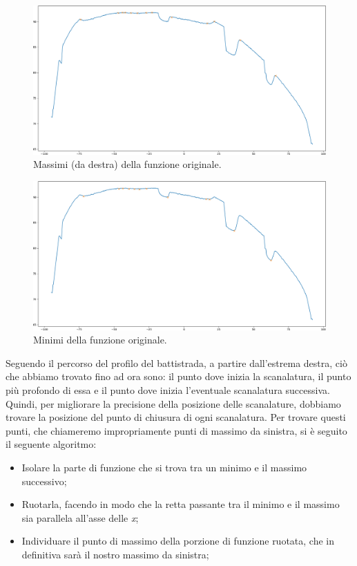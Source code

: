 \begin{figure}[H]
	\centering
	\includegraphics[width=0.9\columnwidth]{./pictures/batt_2_analisi_6.png}
	\caption{Massimi (da destra) della funzione originale.}\label{fig:batt_2_analisi_6}
\end{figure}

\begin{figure}[H]
	\centering
	\includegraphics[width=0.9\columnwidth]{./pictures/batt_2_analisi_7.png}
	\caption{Minimi della funzione originale.}\label{fig:batt_2_analisi_7}
\end{figure}

\noindent Seguendo il percorso del profilo del battistrada, a partire dall'estrema destra, ciò che abbiamo trovato fino ad ora sono: il punto dove inizia la scanalatura, il punto più profondo di essa e il punto dove inizia l'eventuale scanalatura successiva.\\
\newline
Quindi, per migliorare la precisione della posizione delle scanalature, dobbiamo trovare la posizione del punto di chiusura di ogni scanalatura.
\newpage
\noindent Per trovare questi punti, che chiameremo impropriamente punti di massimo da sinistra, si è seguito il seguente algoritmo:

\begin{itemize}
	\item Isolare la parte di funzione che si trova tra un minimo e il massimo successivo;
	\item Ruotarla, facendo in modo che la retta passante tra il minimo e il massimo sia parallela all'asse delle \textit{x};
	\item Individuare il punto di massimo della porzione di funzione ruotata, che in definitiva sarà il nostro massimo da sinistra;
\end{itemize}

